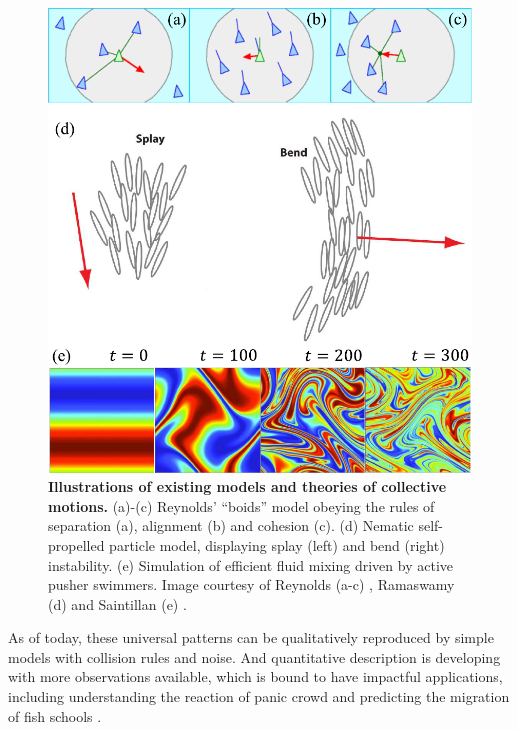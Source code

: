 \begin{figure}[!htbp]
	\begin{center}
	\includegraphics[width=5.5 in]{Figs/1-Intro/4.pdf}
	\end{center}
	\caption[Figure 1.4:]
	{
	\textbf{Illustrations of existing models and theories of collective motions.}
	(a)-(c) Reynolds’ “boids” model obeying the rules of separation (a), alignment (b) and cohesion (c).
	(d) Nematic self-propelled particle model, displaying splay (left) and bend (right) instability.
	(e) Simulation of efficient fluid mixing driven by active pusher swimmers.
	Image courtesy of Reynolds (a-c) \cite{Reynolds1987}, Ramaswamy (d) \cite{Ramaswamy2010} and Saintillan (e) \cite{Saintillan2008b}.
	}
	\label{fig:1-4}
\end{figure}

As of today, these universal patterns can be qualitatively reproduced by simple models with collision rules and noise. And quantitative description is developing with more observations available, which is bound to have impactful applications, including understanding the reaction of panic crowd and predicting the migration of fish schools
\cite{Vicsek2012}.

